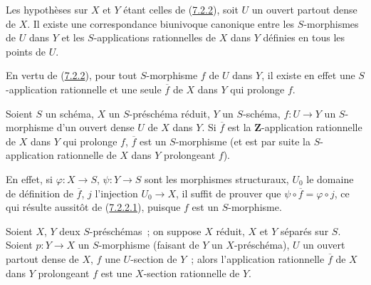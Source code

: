 \begin{corollary}[7.2.3]
\label{I.7.2.3-fr}
Les hypothèses sur $X$ et $Y$ étant celles de
(\hyperref[I.7.2.2-fr]{7.2.2}), soit $U$ un ouvert partout dense de $X$. Il
existe une correspondance biunivoque canonique entre les $S$-morphismes de
$U$ dans $Y$ et les $S$-applications rationnelles de $X$ dans $Y$ définies
en tous les points de $U$.
\end{corollary}

En vertu de (\hyperref[I.7.2.2-fr]{7.2.2}), pour tout $S$-morphisme $f$ de
$U$ dans $Y$, il existe en effet une $S$-application rationnelle et une seule
$\overline f$ de $X$ dans $Y$ qui prolonge $f$.

\begin{corollary}[7.2.4]
\label{I.7.2.4-fr}
Soient $S$ un schéma, $X$ un $S$-préschéma réduit, $Y$ un $S$-schéma,
$f:U\to Y$ un $S$-morphisme d'un ouvert dense $U$ de $X$ dans $Y$. Si
$\overline f$ est la $\mathbf{Z}$-application rationnelle de $X$ dans $Y$ qui
prolonge $f$, $\overline f$ est un $S$-morphisme (et est par suite la
$S$-application rationnelle de $X$ dans $Y$ prolongeant $f$).
\end{corollary}

En effet, si $\varphi:X\to S$, $\psi:Y\to S$ sont les morphismes structuraux,
$U_0$ le domaine de définition de $\overline f$, $j$ l'injection $U_0\to X$,
il suffit de prouver que $\psi\circ\overline f=\varphi\circ j$, ce qui résulte
aussitôt de (\hyperref[I.7.2.2.1-fr]{7.2.2.1}), puisque $f$ est un
$S$-morphisme.

\begin{corollary}[7.2.5]
\label{I.7.2.5-fr}
Soient $X$, $Y$ deux $S$-préschémas~; on suppose $X$ réduit, $X$ et $Y$
séparés sur $S$. Soient $p:Y\to X$ un $S$-morphisme (faisant de $Y$ un
$X$-préschéma), $U$ un ouvert partout dense de $X$, $f$ une $U$-section de
$Y$~; alors l'application rationnelle $\overline f$ de $X$ dans $Y$
prolongeant $f$ est une $X$-section rationnelle de $Y$.
\end{corollary}

